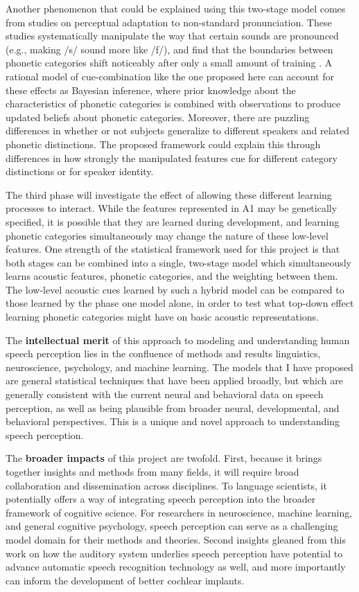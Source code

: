 \documentclass[12pt]{article}
\begin{document}
Another phenomenon that could be explained using this two-stage model comes from studies on perceptual adaptation to non-standard pronunciation.  These studies systematically manipulate the way that certain sounds are pronounced (e.g., making /s/ sound more like /f/), and find that the boundaries between phonetic categories shift noticeably after only a small amount of training \cite{Kraljic2006}.  A rational model of cue-combination like the one proposed here can account for these effects as Bayesian inference, where prior knowledge about the characteristics of phonetic categories is combined with observations to produce updated beliefs about phonetic categories.  Moreover, there are puzzling differences in whether or not subjects generalize to different speakers and related phonetic distinctions.  The proposed framework could explain this through differences in how strongly the manipulated features cue for different category distinctions or for speaker identity.

The third phase will investigate the effect of allowing these different learning processes to interact.  While the features represented in A1 may be genetically specified, it is possible that they are learned during development, and learning phonetic categories simultaneously may change the nature of these low-level features.  One strength of the statistical framework used for this project is that both stages can be combined into a single, two-stage model which simultaneously learns acoustic features, phonetic categories, and the weighting between them.  The low-level acoustic cues learned by such a hybrid model can be compared to those learned by the phase one model alone, in order to test what top-down effect learning phonetic categories might have on basic acoustic representations.

The \textbf{intellectual merit} of this approach to modeling and understanding human speech perception lies in the confluence of methods and results linguistics, neuroscience, psychology, and machine learning.  The models that I have proposed are general statistical techniques that have been applied broadly, but which are generally consistent with the current neural and behavioral data on speech perception, as well as being plausible from broader neural, developmental, and behavioral perspectives.  This is a unique and novel approach to understanding speech perception.

The \textbf{broader impacts} of this project are twofold.  First, because it brings together insights and methods from many fields, it will require broad collaboration and dissemination across disciplines.  To language scientists, it potentially offers a way of integrating speech perception into the broader framework of cognitive science.  For researchers in neuroscience, machine learning, and general cognitive psychology, speech perception can serve as a challenging model domain for their methods and theories.  Second insights gleaned from this work on how the auditory system underlies speech perception have potential to advance automatic speech recognition technology as well, and more importantly can inform the development of better cochlear implants.



{
\fontsize{10}{10}
\selectfont

}
\end{document}
